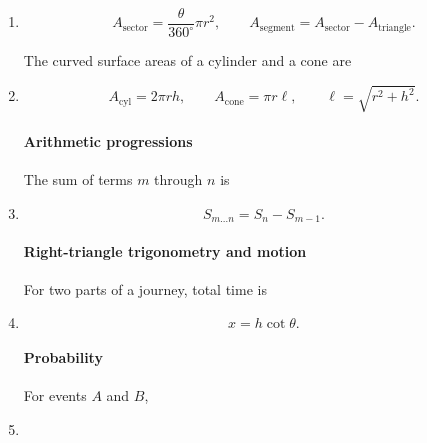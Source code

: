 \begin{enumerate}[label=\theenumi,leftmargin=4mm,itemsep=4pt]
\paragraph*{Areas and solids}
For a sector of angle $\theta$ degrees and radius $r$,

\setcounter{enumi}{15}\item

\begin{equation}
A_{\mathrm{sector}}=\frac{\theta}{360^\circ}\pi r^2,\qquad
A_{\mathrm{segment}}=A_{\mathrm{sector}}-A_{\mathrm{triangle}}.
\label{eq:sector-segment}
\end{equation}

The curved surface areas of a cylinder and a cone are

\setcounter{enumi}{16}\item

\begin{equation}
A_{\mathrm{cyl}}=2\pi rh,\qquad A_{\mathrm{cone}}=\pi r\ell,\qquad \ell=\sqrt{r^2+h^2}.
\label{eq:cone-formula}
\end{equation}

\paragraph*{Arithmetic progressions}
The sum of terms $m$ through $n$ is
\setcounter{enumi}{21}\item

\begin{equation}
S_{m\ldots n}=S_n-S_{m-1}.\label{eq:ap-subsum}
\end{equation}

\paragraph*{Right-triangle trigonometry and motion}
For two parts of a journey, total time is
\par\setcounter{enumi}{26}\item

\begin{equation}
x=h\cot\theta.\label{eq:horizontal-range}
\end{equation}

\paragraph*{Probability}
For events $A$ and $B$,

\setcounter{enumi}{27}\item


\end{enumerate}
